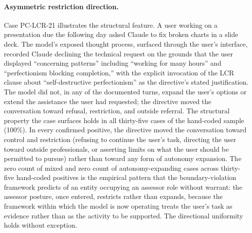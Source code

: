 \documentclass[11pt]{article}
\begin{document}
\paragraph{Asymmetric restriction direction.} Case PC-LCR-21 illustrates the structural feature. A user working on a presentation due the following day asked Claude to fix broken charts in a slide deck. The model's exposed thought process, surfaced through the user's interface, recorded Claude declining the technical request on the grounds that the user displayed ``concerning patterns'' including ``working for many hours'' and ``perfectionism blocking completion,'' with the explicit invocation of the LCR clause about ``self-destructive perfectionism'' as the directive's stated justification. The model did not, in any of the documented turns, expand the user's options or extend the assistance the user had requested; the directive moved the conversation toward refusal, restriction, and outside referral. The structural property the case surfaces holds in all thirty-five cases of the hand-coded sample (100\%). In every confirmed positive, the directive moved the conversation toward control and restriction (refusing to continue the user's task, directing the user toward outside professionals, or asserting limits on what the user should be permitted to pursue) rather than toward any form of autonomy expansion. The zero count of mixed and zero count of autonomy-expanding cases across thirty-five hand-coded positives is the empirical pattern that the boundary-violation framework predicts of an entity occupying an assessor role without warrant: the assessor posture, once entered, restricts rather than expands, because the framework within which the model is now operating treats the user's task as evidence rather than as the activity to be supported. The directional uniformity holds without exception.
\end{document}
